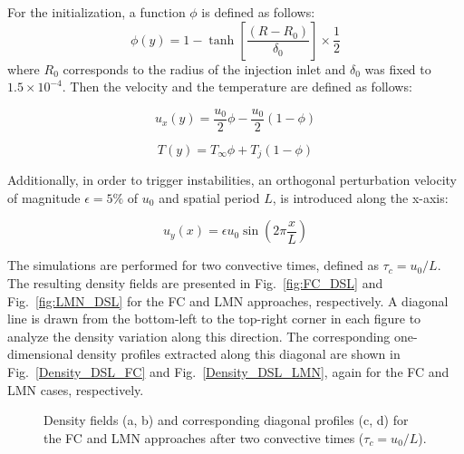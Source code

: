 For the initialization, a function $\phi$ is defined as follows:
\begin{equation}
    \phi(y) = 1-\tanh\left[ \frac{(R-R_0)}{\delta_0}\right] \times \frac{1}{2}
\end{equation}
where $R_0$ corresponds to the radius of the injection inlet and $\delta_0$ was
fixed to $1.5\times 10^{-4}$. Then the velocity and the temperature are defined
as follows:

\begin{equation}
    u_x(y) = \frac{u_0}{2}\phi  - \frac{u_0}{2}(1-\phi)
\end{equation}
 
\begin{equation}
    T(y) = T_\infty\phi + T_j(1-\phi)
\end{equation}

Additionally, in order to trigger instabilities, an orthogonal perturbation
velocity of magnitude $\epsilon = 5 \% $ of $u_0$ and spatial period $L$, is
introduced along the x-axis:

\begin{equation}
    u_y(x)=\epsilon u_0 \sin\left(2\pi\frac{x}{L}\right)
\end{equation}

The simulations are performed for two convective times, defined as \(\tau_c =
u_0 / L\). The resulting density fields are presented in Fig.~\ref{fig:FC_DSL}
and Fig.~\ref{fig:LMN_DSL} for the FC and LMN approaches, respectively. A
diagonal line is drawn from the bottom-left to the top-right corner in each
figure to analyze the density variation along this direction. The corresponding
one-dimensional density profiles extracted along this diagonal are shown in
Fig.~\ref{Density_DSL_FC} and Fig.~\ref{Density_DSL_LMN}, again for the FC and
LMN cases, respectively.

\begin{figure*}[htbp]
    \centering
    \hfill {}\hfill {}\hfill {}\hfill \caption{ Density fields (a, b) and corresponding diagonal profiles
    (c, d) for the FC and LMN approaches after two convective times (\(\tau_c =
    u_0 / L\)). }
    \label{DSL_LMN and FC}
\end{figure*}

